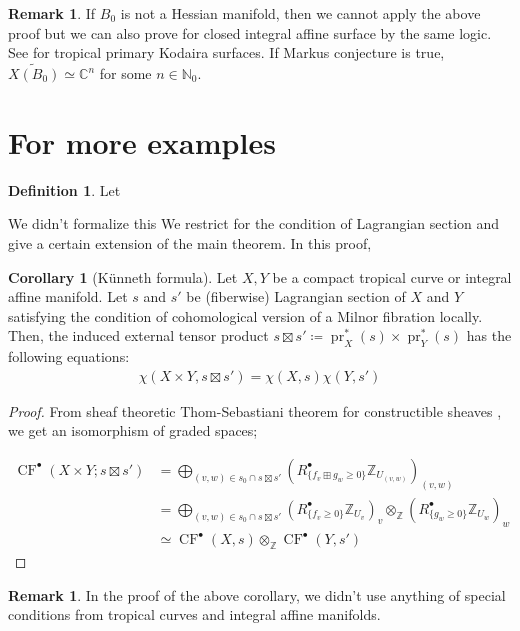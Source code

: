 \documentclass[a4paper,dvipdfmx,reqno,12pt]{amsart}
\theoremstyle{definition}
\newtheorem{Def}[Thm]{Definition}
\newtheorem{Cor}[Thm]{Corollary}
\newtheorem{Rmk}[Thm]{Remark}
\newcommand{\deq}{\coloneqq}
\newcommand{\C}{\mathbb{C}}%
\newcommand{\Z}{\mathbb{Z}}%
\newcommand{\N}{\mathbb{N}_{0}}%
\newcommand{\opn}[1]{\operatorname{#1}}
\numberwithin{equation}{section}
\begin{document}
\begin{Rmk}
If $B_0$ is not a Hessian manifold, then we cannot apply the above proof
but we can also prove for closed integral affine surface by the same logic.
See \cite{MR1422337} for tropical primary Kodaira surfaces.
If Markus conjecture is true, $\widetilde{X(B_0)}\simeq \C^{n}$
for some $n\in \N$.
\end{Rmk}

\section{For more examples}



\begin{Def}
Let 
\end{Def}
We didn't formalize this 
We restrict for the condition of Lagrangian section and 
give a certain extension of the main theorem.
In this proof,
\begin{Cor}[{K\"unneth formula}]
Let $X,Y$ be a compact tropical curve or integral affine manifold.
Let $s$ and $s'$ be (fiberwise) Lagrangian section of $X$ and $Y$ 
satisfying the condition of cohomological version of a Milnor 
fibration \cite[Assumption 1.1.1]{MR2031639} locally.
Then, the induced external tensor product 
$s\boxtimes s'\deq \opn{pr}_X^{*} (s)\times \opn{pr}_Y^{*}(s)$
has the following equations:
\begin{align}
\chi(X\times Y,s\boxtimes s')=\chi(X,s)\chi(Y,s')
\end{align}

\end{Cor}
\begin{proof}
From sheaf theoretic Thom-Sebastiani theorem for constructible sheaves 
\cite[Corollary 1.2.1]{MR2031639}, we get an isomorphism of 
graded spaces;

\begin{align}
\opn{CF}^{\bullet}(X\times Y;s\boxtimes s') 
& =\bigoplus_{(v,w)\in s_0\cap s\boxtimes s'}
(R^{\bullet}_{\{f_v\boxplus g_w\geq 0\}}\Z_{U_{(v,w)}})_{(v,w)} \\
& =\bigoplus_{(v,w)\in s_0\cap s\boxtimes s'}
(R^{\bullet}_{\{f_v\geq 0\}}\Z_{U_v})_v
\otimes_{\Z} (R^{\bullet}_{\{g_w\geq 0\}}\Z_{U_w})_w \\
& \simeq
\opn{CF}^{\bullet}(X,s)\otimes_{\Z} \opn{CF}^{\bullet}(Y,s') 
\end{align}

\end{proof}

\begin{Rmk}
In the proof of the above corollary, we didn't use anything
of special conditions from tropical curves and integral
affine manifolds.
\end{Rmk}
\end{document}
